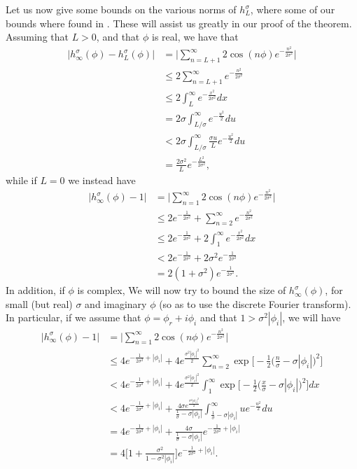 \documentclass[../thesis-main/thesis-main]{subfiles}
\begin{document}
Let us now give some bounds on the various norms of $h_L^\sigma$, where some of our bounds where found in \cite{Cook09}.  These will assist us greatly in our proof of the theorem.  Assuming that $L > 0$, and that $\phi$ is real, we have that
\begin{align}
  \big|h_{\infty}^{\sigma}(\phi) - h_{L}^{\sigma}(\phi) \big| &= \Big| \sum_{n=L+1}^\infty 2 \cos (n\phi) e^{- \frac{n^2}{2\sigma^2}}\Big|\\
   &\leq 2 \sum_{n = L+1}^\infty e^{ -\frac{n^2}{2\sigma^2}}\\ 
   &\leq 2 \int_{L}^\infty e^{- \frac{x^2}{2\sigma^2}} dx\\
   &= 2 \sigma \int_{L/\sigma}^\infty e^{- \frac{u^2}{2}}{du}\\
   &< 2 \sigma \int_{L/\sigma}^\infty \frac{\sigma u}{L} e^{-\frac{u^2}{2}} du\\
   &= \frac{2 \sigma^2}{L} e^{- \frac{L^2}{2\sigma^2}},
\end{align}
while if $L = 0$ we instead have
\begin{align}
  \big|h_{\infty}^{\sigma}(\phi) - 1 \big| &= \Big| \sum_{n=1}^\infty 2 \cos (n\phi) e^{- \frac{n^2}{2\sigma^2}}\Big|\\
   &\leq 2e^{- \frac{1}{2\sigma^2}} +  \sum_{n = 2}^\infty e^{ -\frac{n^2}{2\sigma^2}}\\ 
   &\leq 2e^{- \frac{1}{2\sigma^2}} + 2 \int_{1}^\infty e^{- \frac{x^2}{2\sigma^2}} dx\\
   &< 2 e^{- \frac{1}{2\sigma^2}} +  2\sigma^2 e^{-\frac{1}{2\sigma^2}}\\
   &= 2(1+ \sigma^2) e^{-\frac{1}{2\sigma^2}}.
\end{align}
In addition, if $\phi$ is complex, We will now try to bound the size of $h_\infty^\sigma(\phi)$, for small (but real) $\sigma$ and imaginary $\phi$ (so as to use the discrete Fourier transform).  In particular, if we assume that $\phi = \phi_r + i \phi_i$ and that $1 > \sigma^2 |\phi_i|$, we will have
\begin{align}
  \big|h_\infty^\sigma(\phi) - 1\big| &= \bigg|\sum_{n=1}^\infty 2 \cos(n \phi) e^{-\frac{n^2}{2\sigma^2}}\Bigg|\\
    &\leq   4 e^{- \frac{1}{2\sigma^2} + |\phi_i|} + 4 e^{ \frac{\sigma^2|\phi_i|^2 }{2}}\sum_{n=2}^\infty \exp\Big[ -\frac{1}{2}\Big(\frac{n}{\sigma} - \sigma |\phi_i|\Big)^2 \Big]\\
    &< 4 e^{ - \frac{1}{2\sigma^2} + |\phi_i|} + 4 e^{ \frac{\sigma^2|\phi_i|^2 }{2}}\int_{1}^\infty  \exp\Big[ -\frac{1}{2}\Big(\frac{x}{\sigma} - \sigma |\phi_i|\Big)^2 \Big]dx\\
    &< 4 e^{-\frac{1}{2\sigma^2} + |\phi_i|} + \frac{4 \sigma e^{\frac{\sigma^2|\phi_i|^2}{2}}}{\frac{1}{\sigma} - \sigma |\phi_i|} \int_{\frac{1}{\sigma} - \sigma|\phi_i|}^\infty u e^{-\frac{u^2}{2}} du\\
    &=  4 e^{-\frac{1}{2\sigma^2} + |\phi_i|} + \frac{4 \sigma}{\frac{1}{\sigma} - \sigma |\phi_i|} e^{-\frac{1}{2\sigma^2} + |\phi_i|}\\
    &= 4 \Big[1 + \frac{\sigma^2}{1 - \sigma^2 |\phi_i|} \Big]e^{-\frac{1}{2\sigma^2} + |\phi_i|} .
\end{align}
\end{document}
